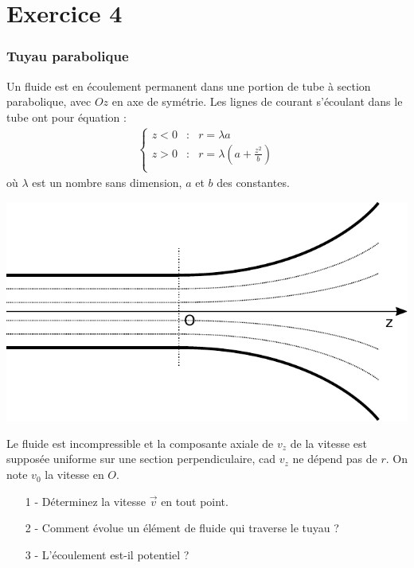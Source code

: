 \documentclass{report}
\begin{document}
\newpage

\section*{Exercice 4}

\subsubsection*{Tuyau parabolique}

Un fluide est en écoulement permanent dans une portion de tube à section parabolique, avec $Oz$ en axe de symétrie. Les lignes de courant s'écoulant dans le tube ont pour équation :
\begin{align*}
		\left\lbrace
\begin{array}{ccc}
z<0 & : & r=\lambda a \\
z>0 & : & r=\lambda \left(a+\frac{z^2}{b} \right) \\
\end{array}\right.
\end{align*}
où $\lambda$ est un nombre sans dimension, $a$ et $b$ des constantes. 

\begin{center}
	\includegraphics[scale=0.5]{meca_flu1.pdf}
\end{center}

Le fluide est incompressible et la composante axiale de $v_z$ de la vitesse est supposée uniforme sur une section perpendiculaire, cad $v_z$ ne dépend pas de $r$. On note $v_0$ la vitesse en $O$.

\begin{itemize}
	\item[1 - ] Déterminez la vitesse $\vec{v}$ en tout point.
	\item[2 - ] Comment évolue un élément de fluide qui traverse le tuyau ? 
	\item[3 - ] L'écoulement est-il potentiel ?
\end{itemize}
\end{document}
